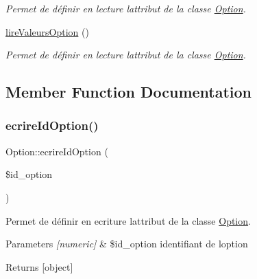 \begin{DoxyCompactItemize}
\begin{DoxyCompactList}\small\item\em Permet de définir en lecture l\textquotesingle{}attribut de la classe \hyperlink{class_option}{Option}. \end{DoxyCompactList}\item 
\hyperlink{class_option_a4ca24d327b036b6e932b396faf72486f}{lire\+Valeurs\+Option} ()
\begin{DoxyCompactList}\small\item\em Permet de définir en lecture l\textquotesingle{}attribut de la classe \hyperlink{class_option}{Option}. \end{DoxyCompactList}\end{DoxyCompactItemize}


\subsection{Member Function Documentation}
\mbox{\label{class_option_a1270d4e227cf6006b0797c2e3dda967b}} 
\subsubsection{\texorpdfstring{ecrire\+Id\+Option()}{ecrireIdOption()}}
{\footnotesize\ttfamily Option\+::ecrire\+Id\+Option (\begin{DoxyParamCaption}\item[{}]{\$id\+\_\+option }\end{DoxyParamCaption})}



Permet de définir en ecriture l\textquotesingle{}attribut de la classe \hyperlink{class_option}{Option}. 


\begin{DoxyParams}{Parameters}
{\em \mbox{[}numeric\mbox{]}} & \$id\+\_\+option identifiant de l\textquotesingle{}option \\
\hline
\end{DoxyParams}
\begin{DoxyReturn}{Returns}
\mbox{[}object\mbox{]} 
\end{DoxyReturn}
\mbox{\label{class_option_af4d726fee7376c202bce7b38dab30bc8}} 
